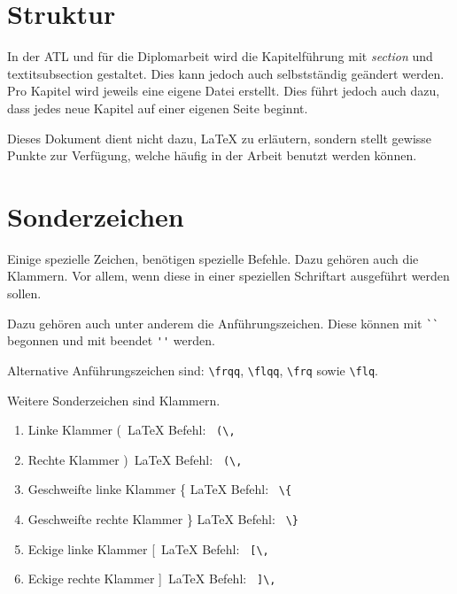 

\section{Struktur}
\label{sec:Struktur}

In der ATL und für die Diplomarbeit wird die Kapitelführung mit \textit{section} und textit{subsection} gestaltet.
Dies kann jedoch auch selbstständig geändert werden.
Pro Kapitel wird jeweils eine eigene Datei erstellt. Dies führt jedoch auch dazu, dass jedes neue Kapitel auf einer eigenen Seite beginnt.

Dieses Dokument dient nicht dazu, \LaTeX{} zu erläutern, sondern stellt gewisse Punkte zur Verfügung, welche häufig in der Arbeit benutzt werden können.

\section{Sonderzeichen}
\label{sec:Sonderzeichen}

Einige spezielle Zeichen, benötigen spezielle Befehle.
Dazu gehören auch die Klammern. Vor allem, wenn diese in einer speziellen Schriftart ausgeführt werden sollen.

Dazu gehören auch unter anderem die Anführungszeichen. Diese können mit \verb|``| begonnen und mit beendet \verb|''| werden.

Alternative Anführungszeichen sind: \frqq \verb|\frqq|, \flqq \verb|\flqq|, \frq \verb|\frq| sowie \flq \verb|\flq|.

Weitere Sonderzeichen sind Klammern.

\begin{enumerate}[parsep=0pt]
  \item Linke Klammer (\, \LaTeX{} Befehl: \verb| (\, |
  \item Rechte Klammer )\, \LaTeX{} Befehl: \verb| (\, |
  \item Geschweifte linke Klammer \{ \LaTeX{} Befehl: \verb| \{ |
  \item Geschweifte rechte Klammer \} \LaTeX{} Befehl: \verb| \} |
  \item Eckige linke Klammer [\, \LaTeX{} Befehl: \verb| [\, |
  \item Eckige rechte Klammer ]\, \LaTeX{} Befehl: \verb| ]\, |
\end{enumerate}

